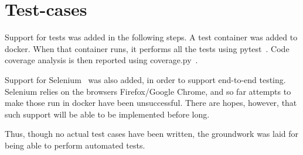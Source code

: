 \newpage

\section{Test-cases}

Support for tests was added in the following steps. A test container
was added to docker. When that container runs, it performs all the tests
using pytest~\cite{pytest}. Code coverage analysis is then reported using
coverage.py~\cite{coverage}.

Support for Selenium~\cite{selenium} was also added, in order to support
end-to-end testing. Selenium relies on the browsers Firefox/Google Chrome, and
so far attempts to make those run in docker have been unsuccessful. There are
hopes, however, that such support will be able to be implemented before long.

Thus, though no actual test cases have been written, the groundwork was laid
for being able to perform automated tests.
